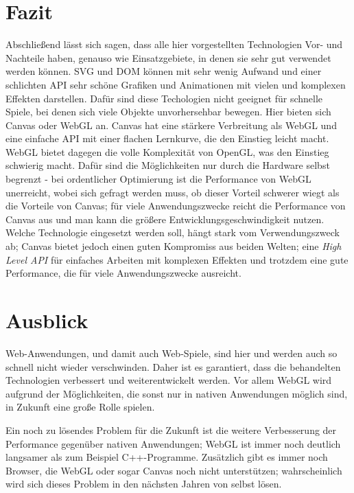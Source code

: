 \documentclass[a4paper, 12pt]{article}
\begin{document}
\section{Fazit}
Abschließend lässt sich sagen, dass alle hier vorgestellten Technologien Vor- und Nachteile haben, genauso wie Einsatzgebiete, in denen sie sehr gut verwendet werden können. SVG und DOM können mit sehr wenig Aufwand und einer schlichten API sehr schöne Grafiken und Animationen mit vielen und komplexen Effekten darstellen. Dafür sind diese Techologien nicht geeignet für schnelle Spiele, bei denen sich viele Objekte unvorhersehbar bewegen. Hier bieten sich Canvas oder WebGL an. Canvas hat eine stärkere Verbreitung als WebGL und eine einfache API mit einer flachen Lernkurve, die den Einstieg leicht macht. WebGL bietet dagegen die volle Komplexität von OpenGL, was den Einstieg schwierig macht. Dafür sind die Möglichkeiten nur durch die Hardware selbst begrenzt - bei ordentlicher Optimierung ist die Performance von WebGL unerreicht, wobei sich gefragt werden muss, ob dieser Vorteil schwerer wiegt als die Vorteile von Canvas; für viele Anwendungszwecke reicht die Performance von Canvas aus und man kann die größere Entwicklungsgeschwindigkeit nutzen. Welche Technologie eingesetzt werden soll, hängt stark vom Verwendungszweck ab; Canvas bietet jedoch einen guten Kompromiss aus beiden Welten; eine \emph{High Level API} für einfaches Arbeiten mit komplexen Effekten und trotzdem eine gute Performance, die für viele Anwendungszwecke ausreicht.
\section{Ausblick}
Web-Anwendungen, und damit auch Web-Spiele, sind hier und werden auch so schnell nicht wieder verschwinden. Daher ist es garantiert, dass die behandelten Technologien verbessert und weiterentwickelt werden. Vor allem WebGL wird aufgrund der Möglichkeiten, die sonst nur in nativen Anwendungen möglich sind, in Zukunft eine große Rolle spielen.

Ein noch zu lösendes Problem für die Zukunft ist die weitere Verbesserung der Performance gegenüber nativen Anwendungen; WebGL ist immer noch deutlich langsamer als zum Beispiel C++-Programme. Zusätzlich gibt es immer noch Browser, die WebGL oder sogar Canvas noch nicht unterstützen; wahrscheinlich wird sich dieses Problem in den nächsten Jahren von selbst lösen.
\newpage

\end{document}
